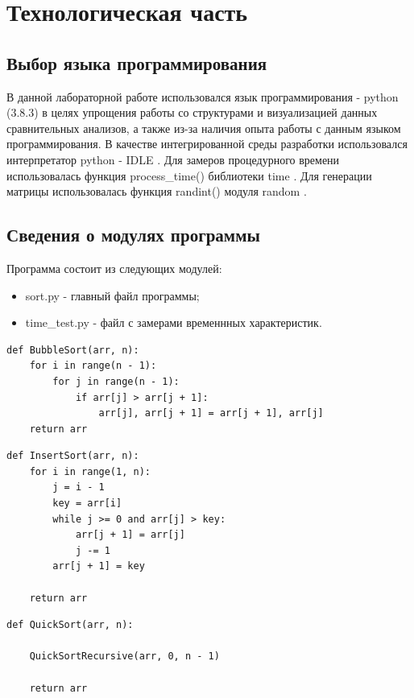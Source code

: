\documentclass[12pt]{report}
\begin{document}
\chapter{Технологическая часть}
\section{Выбор языка программирования}
В данной лабораторной работе использовался язык программирования - python (3.8.3) \cite{bib1} в целях упрощения работы со структурами и визуализацией данных сравнительных анализов, а также из-за наличия опыта работы с данным языком программирования. В качестве интегрированной среды разработки использовался интерпретатор python - IDLE  \cite{bib2}. Для замеров процедурного времени использовалась функция process\_time() библиотеки time \cite{bib3}.  Для генерации матрицы использовалась функция randint() модуля random \cite{bib4}.

\section{Сведения о модулях программы}
Программа состоит из следующих модулей:
\begin{itemize}
	\item sort.py - главный файл программы;
	\item time\_test.py - файл с замерами временнных характеристик.
\end{itemize}

\begin{lstlisting}[label=some-code,caption=Подпрограмма алгоритма сортировки "пузырьком"]
def BubbleSort(arr, n):
    for i in range(n - 1):
        for j in range(n - 1):
            if arr[j] > arr[j + 1]:
                arr[j], arr[j + 1] = arr[j + 1], arr[j]
    return arr            

\end{lstlisting}

\begin{lstlisting}[label=some-code,caption=Подпрограмма алгоритма сортировки вставками]
def InsertSort(arr, n):
    for i in range(1, n):
        j = i - 1 
        key = arr[i]
        while j >= 0 and arr[j] > key:
            arr[j + 1] = arr[j]
            j -= 1
        arr[j + 1] = key
    
    return arr
\end{lstlisting}

\begin{lstlisting}[label=some-code,caption=Подпрограмма быстрой сортировки]
def QuickSort(arr, n):  

    QuickSortRecursive(arr, 0, n - 1)
  
    return arr
\end{lstlisting}
\end{document}
